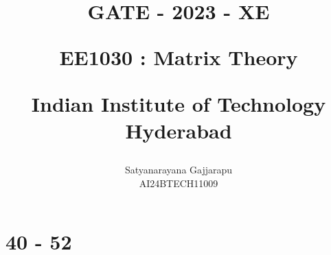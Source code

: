 \documentclass[journal]{IEEEtran}
\begin{document}

\vspace{3cm}




\title{
GATE - 2023 - XE

\large{EE1030 : Matrix Theory}

Indian Institute of Technology Hyderabad
}
\author{Satyanarayana Gajjarapu

AI24BTECH11009
}	





\maketitle




\bigskip

\renewcommand{\thefigure}{\theenumi}
\renewcommand{\thetable}{\theenumi}


\section{40 - 52}
\end{document}
